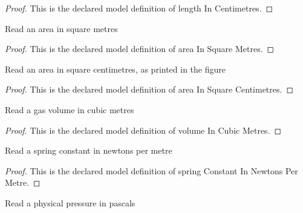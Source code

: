 \begin{proof}
  This is the declared model definition of length In Centimetres.
\end{proof}
\begin{definition}
  \label{def:physics:phyx-mini-0416:phyxminiproblems-problemphyxmini0416-areainsquaremetres}
  Read an area in square metres
\end{definition}
\begin{proof}
  This is the declared model definition of area In Square Metres.
\end{proof}
\begin{definition}
  \label{def:physics:phyx-mini-0416:phyxminiproblems-problemphyxmini0416-areainsquarecentimetres}
  Read an area in square centimetres, as printed in the figure
\end{definition}
\begin{proof}
  This is the declared model definition of area In Square Centimetres.
\end{proof}
\begin{definition}
  \label{def:physics:phyx-mini-0416:phyxminiproblems-problemphyxmini0416-volumeincubicmetres}
  Read a gas volume in cubic metres
\end{definition}
\begin{proof}
  This is the declared model definition of volume In Cubic Metres.
\end{proof}
\begin{definition}
  \label{def:physics:phyx-mini-0416:phyxminiproblems-problemphyxmini0416-springconstantinnewtonspermetre}
  Read a spring constant in newtons per metre
\end{definition}
\begin{proof}
  This is the declared model definition of spring Constant In Newtons Per Metre.
\end{proof}
\begin{definition}
  \label{def:physics:phyx-mini-0416:phyxminiproblems-problemphyxmini0416-pressureinpascals}
  Read a physical pressure in pascals
\end{definition}
